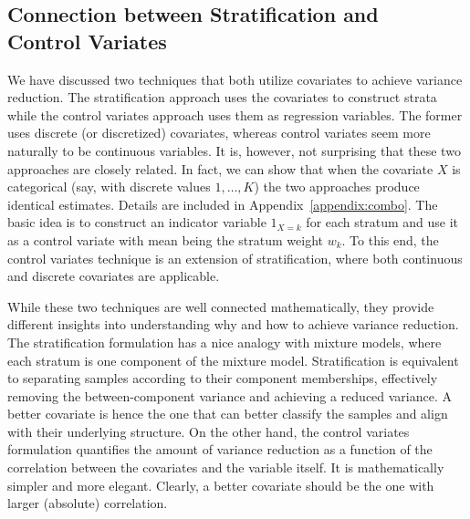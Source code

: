\documentclass{sig-alternate}
\begin{document}

\subsection{Connection between Stratification and \\Control Variates} \label{sec:combo}
We have discussed two techniques that both utilize covariates to achieve variance reduction. The stratification approach uses the covariates to construct strata while the control variates approach uses them as regression variables.
The former uses discrete (or discretized) covariates, whereas control variates seem more naturally to be continuous variables. It is, however, not surprising that these two approaches are closely related. In fact, we can show that when the covariate $X$ is categorical (say, with discrete values $1,\dots, K$) the two approaches produce identical estimates. Details are included in Appendix~\ref{appendix:combo}. The basic idea is to construct an indicator variable $1_{X=k}$ for each stratum and use it as a control variate with mean  being the stratum weight $w_k$. To this end, the control variates technique is an extension of stratification, where both continuous and discrete covariates are applicable.

While these two techniques are well connected mathematically, they provide different insights into understanding why and how to achieve variance reduction.   
The stratification formulation has a nice analogy with mixture models, where each stratum is one component of the mixture model. Stratification is equivalent to separating samples according to their component memberships, effectively removing the between-component variance and achieving a reduced variance. A better covariate is hence the one that can better classify the samples and align with their underlying structure.
On the other hand, the control variates formulation quantifies the amount of variance reduction as a function of the correlation between the covariates and the variable itself. It is mathematically simpler and more elegant. Clearly, a better covariate should be the one with larger (absolute) correlation. 

 
\end{document}

